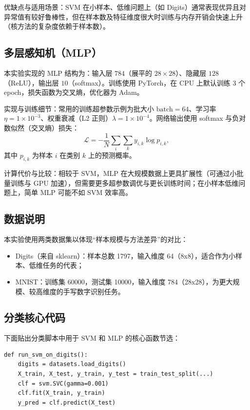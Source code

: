 优缺点与适用场景：SVM 在小样本、低维问题上（如 Digits）通常表现优异且对异常值有较好鲁棒性，但在样本数及特征维度很大时训练与内存开销会快速上升（核方法的复杂度依赖于样本数）。

\subsection{多层感知机（MLP）}
本实验实现的 MLP 结构为：输入层 $784$（展平的 $28\times28$）、隐藏层 $128$（ReLU），输出层 $10$（softmax）。训练使用 PyTorch，在 CPU 上默认训练 $3$ 个 epoch，损失函数为交叉熵，优化器为 Adam。

实现与训练细节：常用的训练超参数示例为批大小 $\text{batch}=64$、学习率 $\eta=1\times10^{-3}$、权重衰减（L2 正则）$\lambda=1\times10^{-4}$。网络输出使用 softmax 与负对数似然（交叉熵）损失：
\begin{equation}
\mathcal{L}= -\frac{1}{N}\sum_{i}\sum_{k} y_{i,k}\log p_{i,k},
\end{equation}
其中 $p_{i,k}$ 为样本 $i$ 在类别 $k$ 上的预测概率。


计算代价与比较：相较于 SVM，MLP 在大规模数据上更具扩展性（可通过小批量训练与 GPU 加速），但需要更多超参数调优与更长训练时间；在小样本低维问题上，简单 MLP 可能不如 SVM 效率高。


\subsection{数据说明}
本实验使用两类数据集以体现“样本规模与方法差异”的对比：
\begin{itemize}
    \item Digits（来自 sklearn）：样本总数 1797，输入维度 64（8x8），适合作为小样本、低维任务的代表；
    \item MNIST：训练集 60000，测试集 10000，输入维度 784（28x28），为更大规模、较高维度的手写数字识别任务。
\end{itemize}

\subsection{分类核心代码}
下面贴出分类脚本中用于 SVM 和 MLP 的核心函数节选：
\begin{lstlisting}[style=cleanpython]
def run_svm_on_digits():
    digits = datasets.load_digits()
    X_train, X_test, y_train, y_test = train_test_split(...)
    clf = svm.SVC(gamma=0.001)
    clf.fit(X_train, y_train)
    y_pred = clf.predict(X_test)
\end{lstlisting}

